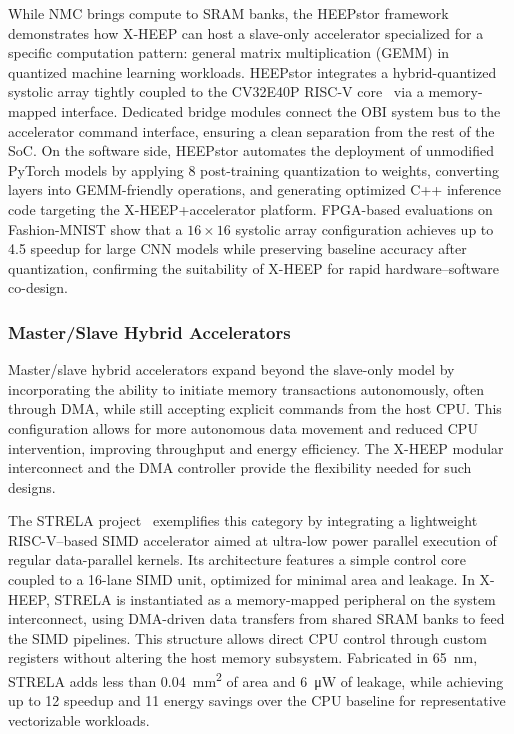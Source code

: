                 While NMC brings compute to SRAM banks, the HEEPstor framework~\cite{systolic_array} demonstrates how \mbox{X-HEEP} can host a slave-only accelerator specialized for a specific computation pattern: general matrix multiplication (GEMM) in quantized machine learning workloads. HEEPstor integrates a hybrid-quantized systolic array tightly coupled to the CV32E40P RISC-V core~\cite{ri5cy} via a memory-mapped interface. Dedicated bridge modules connect the OBI system bus to the accelerator command interface, ensuring a clean separation from the rest of the SoC. On the software side, HEEPstor automates the deployment of unmodified PyTorch models by applying \SI{8}{\bit} post-training quantization to weights, converting layers into GEMM-friendly operations, and generating optimized C++ inference code targeting the \mbox{X-HEEP}+accelerator platform. FPGA-based evaluations on Fashion-MNIST show that a $16 \times 16$ systolic array configuration achieves up to \SI{4.5}{\times} speedup for large CNN models while preserving baseline accuracy after quantization, confirming the suitability of \mbox{X-HEEP} for rapid hardware–software co-design.
            
            \subsubsection*{Master/Slave Hybrid Accelerators}
            
                Master/slave hybrid accelerators expand beyond the slave-only model by incorporating the ability to initiate memory transactions autonomously, often through DMA, while still accepting explicit commands from the host CPU. This configuration allows for more autonomous data movement and reduced CPU intervention, improving throughput and energy efficiency. The \mbox{X-HEEP} modular interconnect and the DMA controller provide the flexibility needed for such designs.
                
                The STRELA project~\cite{strela} exemplifies this category by integrating a lightweight RISC-V–based SIMD accelerator aimed at ultra-low power parallel execution of regular data-parallel kernels. Its architecture features a simple control core coupled to a \SI{16}{}-lane SIMD unit, optimized for minimal area and leakage. In \mbox{X-HEEP}, STRELA is instantiated as a memory-mapped peripheral on the system interconnect, using DMA-driven data transfers from shared SRAM banks to feed the SIMD pipelines. This structure allows direct CPU control through custom registers without altering the host memory subsystem. Fabricated in \SI{65}{\nano\meter}, STRELA adds less than \SI{0.04}{\milli\meter\squared} of area and \SI{6}{\micro\watt} of leakage, while achieving up to \SI{12}{\times} speedup and \SI{11}{\times} energy savings over the CPU baseline for representative vectorizable workloads.
                
